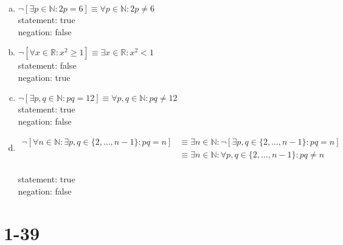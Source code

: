 \documentclass{article}
\newcommand{\N}{\mathbb{N}}
\newcommand{\R}{\mathbb{R}}
\begin{document}
\begin{enumerate}[a)]
    \item $\neg\left[\exists p \in \N : 2p = 6\right] \equiv \forall p
        \in \N : 2p \neq 6$ \\
        statement: true \\
        negation: false \\
    \item $\neg\left[\forall x \in \R : x^2 \geq 1 \right] \equiv 
        \exists x \in \R : x^2 < 1$ \\
        statement: false \\
        negation: true \\
    \item $\neg\left[\exists p, q \in \N : pq = 12 \right] \equiv 
        \forall p,q \in \N : pq \neq 12$ \\
        statement: true \\
        negation: false \\
    \item \begin{align*}
            \neg\left[\forall n \in \N : \exists p,q \in \{2, \dots, n - 1\} : pq = n\right]
        &\equiv \exists n \in \N : \neg \left[\exists p,q \in \{2, \dots, n - 1\} : pq = n\right] \\
        &\equiv \exists n \in \N : \forall p,q \in \{2,\dots, n-1\} : pq \neq n
        \end{align*} \\
        statement: true \\
        negation: false \\
\end{enumerate}

\section{1-39}
\end{document}
